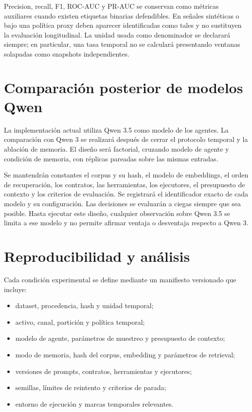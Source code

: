 Precision, recall, F1, ROC-AUC y PR-AUC se conservan como métricas auxiliares
cuando existen etiquetas binarias defendibles. En señales sintéticas o bajo una
política proxy deben aparecer identificadas como tales y no sustituyen la
evaluación longitudinal. La unidad usada como denominador se declarará siempre;
en particular, una tasa temporal no se calculará presentando ventanas solapadas
como snapshots independientes.

\section{Comparación posterior de modelos Qwen}

La implementación actual utiliza Qwen 3.5 como modelo de los agentes. La
comparación con Qwen 3 se realizará después de cerrar el protocolo temporal y
la ablación de memoria. El diseño será factorial, cruzando modelo de agente y
condición de memoria, con réplicas pareadas sobre las mismas entradas.

Se mantendrán constantes el corpus y su hash, el modelo de embeddings, el orden
de recuperación, los contratos, las herramientas, los ejecutores, el
presupuesto de contexto y los criterios de evaluación. Se registrará el
identificador exacto de cada modelo y su configuración. Las decisiones se
evaluarán a ciegas siempre que sea posible. Hasta ejecutar este diseño, cualquier
observación sobre Qwen 3.5 se limita a ese modelo y no permite afirmar ventaja o
desventaja respecto a Qwen 3.

\section{Reproducibilidad y análisis}

Cada condición experimental se define mediante un manifiesto versionado que
incluye:

\begin{itemize}
  \item dataset, procedencia, hash y unidad temporal;
  \item activo, canal, partición y política temporal;
  \item modelo de agente, parámetros de muestreo y presupuesto de contexto;
  \item modo de memoria, hash del corpus, embedding y parámetros de retrieval;
  \item versiones de prompts, contratos, herramientas y ejecutores;
  \item semillas, límites de reintento y criterios de parada;
  \item entorno de ejecución y marcas temporales relevantes.
\end{itemize}


